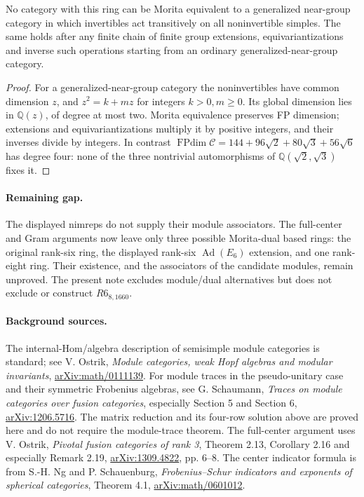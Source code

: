 \documentclass[11pt]{article}
\newcommand{\C}{\mathcal C}\newcommand{\I}{\mathcal I}\newcommand{\M}{\mathcal M}
\newcommand{\FPdim}{\operatorname{FPdim}}
\begin{document}
\begin{corollary}
No category with this ring can be Morita equivalent to a generalized
near-group category in which invertibles act transitively on all
noninvertible simples. The same holds after any finite chain of finite
group extensions, equivariantizations and inverse such operations
starting from an ordinary generalized-near-group category.
\end{corollary}
\begin{proof}
For a generalized-near-group category the noninvertibles have common
dimension $z$, and $z^2=k+mz$ for integers $k>0,m\geq0$. Its global
dimension lies in $\mathbb Q(z)$, of degree at most two. Morita
equivalence preserves FP dimension; extensions and equivariantizations
multiply it by positive integers, and their inverses divide by integers.
In contrast $\FPdim\C=144+96\sqrt2+80\sqrt3+56\sqrt6$ has degree four:
none of the three nontrivial automorphisms of
$\mathbb Q(\sqrt2,\sqrt3)$ fixes it.
\end{proof}

\paragraph{Remaining gap.}
The displayed nimreps do not supply their module associators.
The full-center and Gram arguments now leave only three possible
Morita-dual based rings: the original rank-six ring, the displayed
rank-six $\operatorname{Ad}(E_6)$ extension, and one rank-eight ring.
Their existence, and the associators of the candidate modules, remain
unproved. The present note excludes module/dual alternatives but does
not exclude or construct $R6_{8,1660}$.

\paragraph{Background sources.}
The internal-Hom/algebra description of semisimple module categories is
standard; see V. Ostrik, \emph{Module categories, weak Hopf algebras and
modular invariants}, \href{https://arxiv.org/abs/math/0111139}{arXiv:math/0111139}.
For module traces in the pseudo-unitary case and their symmetric
Frobenius algebras, see G. Schaumann, \emph{Traces on module categories
over fusion categories}, especially Section 5 and Section 6,
\href{https://arxiv.org/abs/1206.5716}{arXiv:1206.5716}.
The matrix reduction and its four-row solution above are proved here
and do not require the module-trace theorem.
The full-center argument uses V. Ostrik, \emph{Pivotal fusion categories
of rank 3}, Theorem 2.13, Corollary 2.16 and especially Remark 2.19,
\href{https://arxiv.org/abs/1309.4822}{arXiv:1309.4822}, pp. 6--8.
The center indicator formula is from S.-H. Ng and P. Schauenburg,
\emph{Frobenius--Schur indicators and exponents of spherical categories},
Theorem 4.1, \href{https://arxiv.org/abs/math/0601012}{arXiv:math/0601012}.
\end{document}
